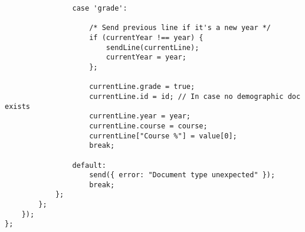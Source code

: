 \begin{verbatim}
                case 'grade':

                    /* Send previous line if it's a new year */
                    if (currentYear !== year) {
                        sendLine(currentLine);
                        currentYear = year;
                    };

                    currentLine.grade = true;
                    currentLine.id = id; // In case no demographic doc exists
                    currentLine.year = year;
                    currentLine.course = course;
                    currentLine["Course %"] = value[0];
                    break;

                default:
                    send({ error: "Document type unexpected" });
                    break;
            };
        };
    });
};
\end{verbatim}